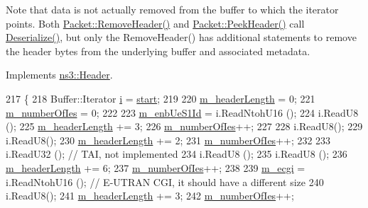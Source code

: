 Note that data is not actually removed from the buffer to which the iterator points. Both \hyperlink{classns3_1_1Packet_a0961eccf975d75f902d40956c93ba63e}{Packet\+::\+Remove\+Header()} and \hyperlink{classns3_1_1Packet_aadc63487bea70945c418f4c3e9b81964}{Packet\+::\+Peek\+Header()} call \hyperlink{classns3_1_1EpcS1APInitialUeMessageHeader_a74d198c4856c95609d20484363e75591}{Deserialize()}, but only the Remove\+Header() has additional statements to remove the header bytes from the underlying buffer and associated metadata. 

Implements \hyperlink{classns3_1_1Header_a78be9400bb66b2a8543606f395ef5396}{ns3\+::\+Header}.


\begin{DoxyCode}
217 \{
218   Buffer::Iterator \hyperlink{bernuolliDistribution_8m_a6f6ccfcf58b31cb6412107d9d5281426}{i} = \hyperlink{namespacevisualizer_1_1core_a2a35e5d8a34af358b508dac8635754e0}{start};
219 
220   \hyperlink{classns3_1_1EpcS1APInitialUeMessageHeader_a50b3b61ac108d11bc42e2dd51e1ecf35}{m\_headerLength} = 0;
221   \hyperlink{classns3_1_1EpcS1APInitialUeMessageHeader_ac1ee41c38988ec5fbadaf31e3a906ae0}{m\_numberOfIes} = 0;
222 
223   \hyperlink{classns3_1_1EpcS1APInitialUeMessageHeader_a236fa237b7be551f37baf0d11f1d1ee6}{m\_enbUeS1Id} = i.ReadNtohU16 ();
224   i.ReadU8 ();
225   \hyperlink{classns3_1_1EpcS1APInitialUeMessageHeader_a50b3b61ac108d11bc42e2dd51e1ecf35}{m\_headerLength} += 3;
226   \hyperlink{classns3_1_1EpcS1APInitialUeMessageHeader_ac1ee41c38988ec5fbadaf31e3a906ae0}{m\_numberOfIes}++;
227 
228   i.ReadU8();
229   i.ReadU8();
230   \hyperlink{classns3_1_1EpcS1APInitialUeMessageHeader_a50b3b61ac108d11bc42e2dd51e1ecf35}{m\_headerLength} += 2;
231   \hyperlink{classns3_1_1EpcS1APInitialUeMessageHeader_ac1ee41c38988ec5fbadaf31e3a906ae0}{m\_numberOfIes}++;
232 
233   i.ReadU32 ();                   \textcolor{comment}{// TAI, not implemented}
234   i.ReadU8 ();
235   i.ReadU8 ();                    
236   \hyperlink{classns3_1_1EpcS1APInitialUeMessageHeader_a50b3b61ac108d11bc42e2dd51e1ecf35}{m\_headerLength} += 6;
237   \hyperlink{classns3_1_1EpcS1APInitialUeMessageHeader_ac1ee41c38988ec5fbadaf31e3a906ae0}{m\_numberOfIes}++;
238 
239   \hyperlink{classns3_1_1EpcS1APInitialUeMessageHeader_a53c7af632e6a6ab097ba6ac764eea0ad}{m\_ecgi} = i.ReadNtohU16 ();    \textcolor{comment}{// E-UTRAN CGI, it should have a different size}
240   i.ReadU8();
241   \hyperlink{classns3_1_1EpcS1APInitialUeMessageHeader_a50b3b61ac108d11bc42e2dd51e1ecf35}{m\_headerLength} += 3;
242   \hyperlink{classns3_1_1EpcS1APInitialUeMessageHeader_ac1ee41c38988ec5fbadaf31e3a906ae0}{m\_numberOfIes}++;

\end{DoxyCode}
